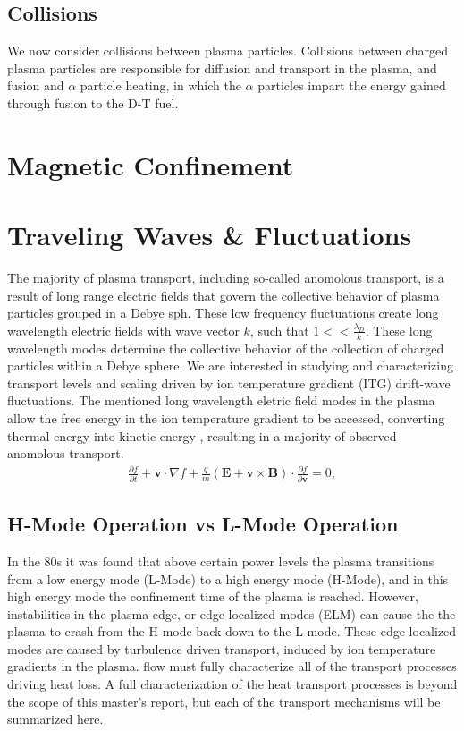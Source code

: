 \documentclass{article}
\begin{document}
\subsection{Collisions}
We now consider collisions between plasma particles.
Collisions between charged plasma particles are responsible for diffusion and transport in the plasma, and fusion and $\alpha$ particle heating, in which the $\alpha$ particles impart the energy gained through fusion to the D-T fuel. 
\section{Magnetic Confinement}

\section{Traveling Waves \& Fluctuations}
The majority of plasma transport, including so-called anomolous transport, is a result of long range electric fields that govern the collective behavior of plasma particles grouped in a Debye sph. These low frequency fluctuations create long wavelength electric fields with wave vector $k$, such that $1 <<\frac{\lambda_D}{k}$. These long wavelength modes determine the collective behavior of the  collection of charged particles within a Debye sphere.   \cite{Horton} We are interested in studying and characterizing transport levels and scaling driven by ion temperature gradient (ITG) drift-wave fluctuations. The mentioned long wavelength eletric field modes in the plasma allow the free energy in the ion temperature gradient to be accessed, converting thermal energy into kinetic energy \cite{Horton}, resulting in a majority of observed anomolous transport.
\begin{align*}
\frac{\partial f}{\partial t} + \textbf{v}\cdot \nabla f + \frac{q}{m}(\textbf{E} + \textbf{v}\times \textbf{B})\cdot \frac{\partial f}{\partial \textbf{v}}=0,
\end{align*}
\subsection{H-Mode Operation vs L-Mode Operation}

In the 80s it was found that above certain power levels the plasma transitions from a low energy mode (L-Mode) to a high energy mode (H-Mode), and in this high energy mode the confinement time of the plasma is reached. However, instabilities in the plasma edge, or edge localized modes (ELM) can cause the the plasma to crash from the H-mode back down to the L-mode. These edge localized modes are caused by turbulence driven transport, induced by ion temperature gradients in the plasma.  flow must fully characterize all of the transport processes driving heat loss. A full characterization of the heat transport processes is beyond the scope of this master's report, but each of the transport mechanisms will be summarized here.
\end{document}
